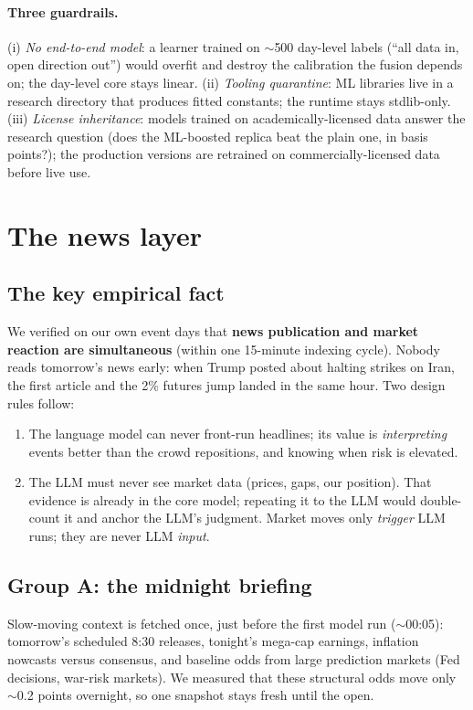 \documentclass[11pt,a4paper]{article}
\begin{document}
\paragraph{Three guardrails.} (i) \emph{No end-to-end model}: a learner
trained on $\sim$500 day-level labels (``all data in, open direction out'')
would overfit and destroy the calibration the fusion depends on; the
day-level core stays linear. (ii) \emph{Tooling quarantine}: ML libraries
live in a research directory that produces fitted constants; the runtime
stays stdlib-only. (iii) \emph{License inheritance}: models trained on
academically-licensed data answer the research question (does the ML-boosted
replica beat the plain one, in basis points?); the production versions are
retrained on commercially-licensed data before live use.

\section{The news layer}

\subsection{The key empirical fact}

We verified on our own event days that \textbf{news publication and market
reaction are simultaneous} (within one 15-minute indexing cycle). Nobody reads
tomorrow's news early: when Trump posted about halting strikes on Iran, the
first article and the 2\% futures jump landed in the same hour. Two design
rules follow:

\begin{enumerate}
\item The language model can never front-run headlines; its value is
\emph{interpreting} events better than the crowd repositions, and knowing when
risk is elevated.
\item The LLM must never see market data (prices, gaps, our position). That
evidence is already in the core model; repeating it to the LLM would
double-count it and anchor the LLM's judgment. Market moves only \emph{trigger}
LLM runs; they are never LLM \emph{input}.
\end{enumerate}

\subsection{Group A: the midnight briefing}

Slow-moving context is fetched once, just before the first model run
($\sim$00:05): tomorrow's scheduled 8:30 releases, tonight's mega-cap earnings,
inflation nowcasts versus consensus, and baseline odds from large prediction
markets (Fed decisions, war-risk markets). We measured that these structural
odds move only $\sim$0.2 points overnight, so one snapshot stays fresh until
the open.
\end{document}

